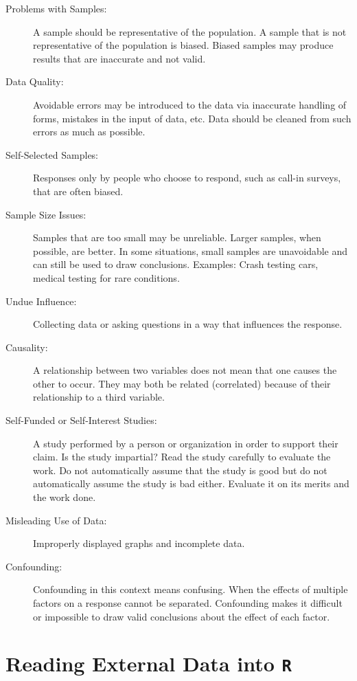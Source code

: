 \documentclass[
]{krantz}
\theoremstyle{definition}
\theoremstyle{definition}
\theoremstyle{definition}
\theoremstyle{remark}
\begin{document}
\begin{description}
\item[Problems with Samples:]
A sample should be representative of the population. A sample that is not representative of the population is biased. Biased samples may produce results that are inaccurate and not valid.
\item[Data Quality:]
Avoidable errors may be introduced to the data via inaccurate handling of forms, mistakes in the input of data, etc. Data should be cleaned from such errors as much as possible.
\item[Self-Selected Samples:]
Responses only by people who choose to respond, such as call-in surveys, that are often biased.
\item[Sample Size Issues:]
Samples that are too small may be unreliable. Larger samples, when possible, are better. In some situations, small samples are unavoidable and can still be used to draw conclusions. Examples: Crash testing cars, medical testing for rare conditions.
\item[Undue Influence:]
Collecting data or asking questions in a way that influences the response.
\item[Causality:]
A relationship between two variables does not mean that one causes the other to occur. They may both be related (correlated) because of their relationship to a third variable.
\item[Self-Funded or Self-Interest Studies:]
A study performed by a person or organization in order to support their claim. Is the study impartial? Read the study carefully to evaluate the work. Do not automatically assume that the study is good but do not automatically assume the study is bad either. Evaluate it on its merits and the work done.
\item[Misleading Use of Data:]
Improperly displayed graphs and incomplete data.
\item[Confounding:]
Confounding in this context means confusing. When the effects of multiple factors on a response cannot be separated. Confounding makes it difficult or impossible to draw valid conclusions about the effect of each factor.
\end{description}

\hypertarget{readingdata}{%
\section{\texorpdfstring{Reading External Data into \texttt{R}}{Reading External Data into R}}\label{readingdata}}
\end{document}
